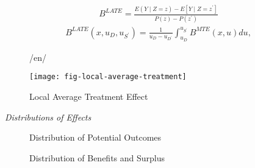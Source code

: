 \begin{frame}
	\begin{align*}
		B^{LATE} = \frac{E(Y\mid Z = z) - E[Y \mid Z = z^\prime]}{P(z) - P(z^\prime)}
	\end{align*}
	\begin{align*}
		B^{LATE}(x, u_D, u_{S^\prime}) = \frac{1}{u_D - u_{D^\prime}} \int_{u_D}^{u_{S^\prime}} B^{MTE}(x, u) du,
	\end{align*}
\end{frame}
\begin{frame}
	\begin{figure}[htp]\centering/en/
		\caption{Local Average Treatment Effect}\label{Local Average Treatment}\scalebox{0.35}
		{\texttt{[image: fig-local-average-treatment]}}
	\end{figure}
\end{frame}


\begin{frame}\begin{center}
		\LARGE\textit{Distributions of Effects}
\end{center}\end{frame}
\begin{frame}
	\begin{figure}\caption{Distribution of Potential Outcomes}
	\end{figure}
\end{frame}
\begin{frame}
	\begin{figure}\caption{Distribution of Benefits and Surplus}
	\end{figure}
\end{frame}
